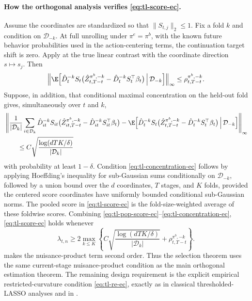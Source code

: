 \documentclass[opre,nonblindrev]{informs4}
\newenvironment{revision}{\begingroup\color{revisionblue}\ignorespaces}{\endgroup}
\newcommand{\norm}[1]{\lVert#1\rVert}
\begin{document}
\begin{revision}
\paragraph{How the orthogonal analysis verifies \eqref{eq:tl-score-ec}.}
Assume the coordinates are standardized so that $\norm{S_{t,j}}_2\le1$.
Fix a fold $k$ and condition on $\mathcal D_{-k}$. At full unrolling under
$\pi^e=\pi^b$, with the known future behavior probabilities used in the
action-centering terms, the continuation target shift is zero. Apply
 at the true linear contrast with the
coordinate direction $s\mapsto s_j$. Then
\begin{equation}
\left\norm{
\E\!\left[
\hat D_t^{-k}S_t
\bigl(\hat Z_{t,T-t}^{\pi^b,-k}-\hat D_t^{-k}S_t^\top\beta_t\bigr)
\,\middle|\,\mathcal D_{-k}
\right]
\right}_\infty
\le
\rho_{t,T-t}^{\pi^b,-k}.
\label{eq:tl-pop-score-ec}
\end{equation}
Suppose, in addition, that conditional maximal concentration on the held-out fold gives, simultaneously over $t$ and $k$,
\begin{equation}
\begin{aligned}
&\left\norm{
\frac{1}{|\mathcal D_k|}
\sum_{i\in\mathcal D_k}
\hat D_{it}^{-k}S_{it}
\bigl(\hat Z_{it,T-t}^{\pi^b,-k}-\hat D_{it}^{-k}S_{it}^\top\beta_t\bigr)
-
\E\!\left[
\hat D_t^{-k}S_t
\bigl(\hat Z_{t,T-t}^{\pi^b,-k}-\hat D_t^{-k}S_t^\top\beta_t\bigr)
\,\middle|\,\mathcal D_{-k}
\right]
\right}_\infty
\\
&\qquad\le
C\sqrt{\frac{\log(dTK/\delta)}{|\mathcal D_k|}}
\end{aligned}
\label{eq:tl-concentration-ec}
\end{equation}
with probability at least $1-\delta$. Condition \eqref{eq:tl-concentration-ec} follows by applying
Hoeffding's inequality for sub-Gaussian sums conditionally on
$\mathcal D_{-k}$, followed by a union bound over the $d$
coordinates, $T$ stages, and $K$ folds, provided the centered
score coordinates have uniformly bounded conditional
sub-Gaussian norms. The pooled score in \eqref{eq:tl-score-ec} is the fold-size-weighted average of these foldwise scores. Combining \eqref{eq:tl-pop-score-ec}--\eqref{eq:tl-concentration-ec}, \eqref{eq:tl-score-ec} holds whenever
\begin{equation}
\lambda_{t,n}
\ge
2\max_{k\le K}
\left\{
C\sqrt{\frac{\log(dTK/\delta)}{|\mathcal D_k|}}
+
\rho_{t,T-t}^{\pi^b,-k}
\right\}.
\label{eq:tl-lambda-ec}
\end{equation}
 makes the nuisance-product term second order. Thus the selection theorem uses the same current-stage nuisance-product condition as the main orthogonal estimation theorem. The remaining design requirement is the explicit empirical restricted-curvature condition \eqref{eq:tl-re-ec}, exactly as in classical thresholded-LASSO analyses and in \citet{zhou2024rewardrelevancefiltered}.

\end{revision}
\end{document}
